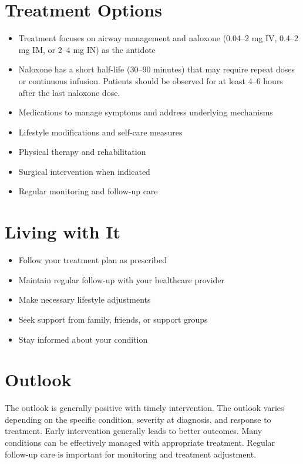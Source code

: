 \section{Treatment Options}
\begin{itemize}[noitemsep]
  \item Treatment focuses on airway management and naloxone (0.04--2 mg IV, 0.4--2 mg IM, or 2--4 mg IN) as the antidote
  \item Naloxone has a short half-life (30--90 minutes) that may require repeat doses or continuous infusion. Patients should be observed for at least 4--6 hours after the last naloxone dose.
  \item Medications to manage symptoms and address underlying mechanisms
  \item Lifestyle modifications and self-care measures
  \item Physical therapy and rehabilitation
  \item Surgical intervention when indicated
  \item Regular monitoring and follow-up care
\end{itemize}
\section{Living with It}
\begin{itemize}[noitemsep]
  \item Follow your treatment plan as prescribed
  \item Maintain regular follow-up with your healthcare provider
  \item Make necessary lifestyle adjustments
  \item Seek support from family, friends, or support groups
  \item Stay informed about your condition
\end{itemize}
\section{Outlook}
The outlook is generally positive with timely intervention. The outlook varies depending on the specific condition, severity at diagnosis, and response to treatment. Early intervention generally leads to better outcomes. Many conditions can be effectively managed with appropriate treatment. Regular follow-up care is important for monitoring and treatment adjustment.
